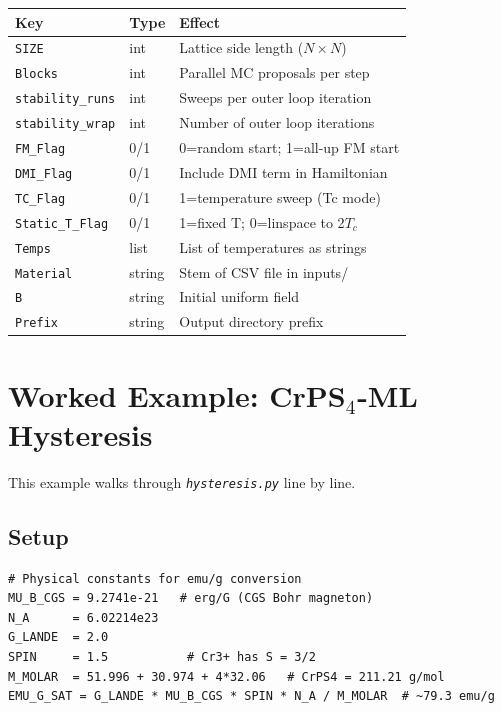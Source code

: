 \documentclass[12pt,a4paper]{article}
\newcommand{\code}[1]{\texttt{#1}}
\newcommand{\file}[1]{\texttt{\textit{#1}}}
\begin{document}
\begin{center}
\begin{longtable}{llp{7cm}}
\toprule
\textbf{Key} & \textbf{Type} & \textbf{Effect} \\
\midrule
\endhead
\code{SIZE}              & int    & Lattice side length ($N \times N$) \\
\code{Blocks}            & int    & Parallel MC proposals per step \\
\code{stability\_runs}   & int    & Sweeps per outer loop iteration \\
\code{stability\_wrap}   & int    & Number of outer loop iterations \\
\code{FM\_Flag}          & 0/1    & 0=random start; 1=all-up FM start \\
\code{DMI\_Flag}         & 0/1    & Include DMI term in Hamiltonian \\
\code{TC\_Flag}          & 0/1    & 1=temperature sweep (Tc mode) \\
\code{Static\_T\_Flag}   & 0/1    & 1=fixed T; 0=linspace to 2$T_c$ \\
\code{Temps}             & list   & List of temperatures as strings \\
\code{Material}          & string & Stem of CSV file in inputs/ \\
\code{B}                 & string & Initial uniform field \\
\code{Prefix}            & string & Output directory prefix \\
\bottomrule
\end{longtable}
\end{center}

\section{Worked Example: CrPS$_4$-ML Hysteresis}
\label{sec:example}

This example walks through \file{hysteresis.py} line by line.

\subsection{Setup}

\begin{lstlisting}[style=python]
# Physical constants for emu/g conversion
MU_B_CGS = 9.2741e-21   # erg/G (CGS Bohr magneton)
N_A      = 6.02214e23
G_LANDE  = 2.0
SPIN     = 1.5           # Cr3+ has S = 3/2
M_MOLAR  = 51.996 + 30.974 + 4*32.06   # CrPS4 = 211.21 g/mol
EMU_G_SAT = G_LANDE * MU_B_CGS * SPIN * N_A / M_MOLAR  # ~79.3 emu/g
\end{lstlisting}
\end{document}
